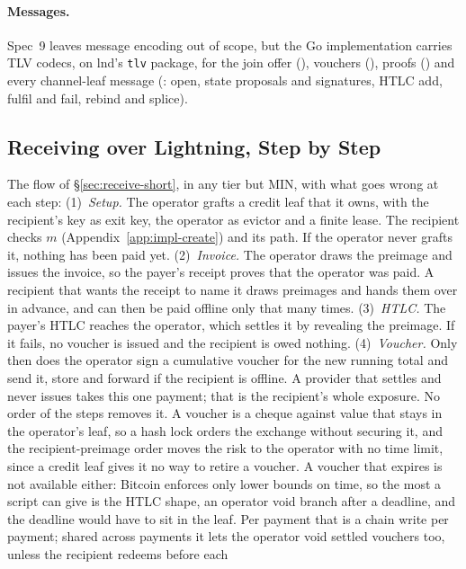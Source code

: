 \paragraph{Messages.} Spec~9 leaves message encoding out of scope, but
the Go implementation carries TLV codecs, on lnd's \texttt{tlv} package, for the
join offer (), vouchers (),
proofs () and every channel-leaf message
(: open, state proposals and signatures, HTLC add,
fulfil and fail, rebind and splice).

\subsection{Receiving over Lightning, Step by Step}\label{app:impl-receive}

The flow of \S\ref{sec:receive-short}, in any tier but MIN, with what goes
wrong at each step:
(1)~\emph{Setup.} The operator grafts a credit leaf that it owns, with
the recipient's key as exit key, the operator as evictor and a finite
lease. The recipient checks $m$ (Appendix~\ref{app:impl-create}) and its
path. If the operator never grafts it, nothing has been paid yet.
(2)~\emph{Invoice.} The operator draws the preimage and issues the
invoice, so the payer's receipt proves that the operator was paid. A
recipient that wants the receipt to name it draws preimages and hands
them over in advance, and can then be paid offline only that many times.
(3)~\emph{HTLC.} The payer's HTLC reaches the operator, which settles it
by revealing the preimage. If it fails, no voucher is issued and the
recipient is owed nothing.
(4)~\emph{Voucher.} Only then does the operator sign a cumulative voucher
for the new running total and send it, store and forward if the
recipient is offline. A provider that settles and never issues takes
this one payment; that is the recipient's whole exposure. No order
of the steps removes it. A voucher is a cheque against value that stays
in the operator's leaf, so a hash lock orders the exchange without
securing it, and the recipient-preimage order moves the risk to the
operator with no time limit, since a credit leaf gives it no way to
retire a voucher. A voucher that expires is not available either:
Bitcoin enforces only lower bounds on time, so the most a script can
give is the HTLC shape, an operator void branch after a deadline, and
the deadline would have to sit in the leaf. Per payment that is a chain
write per payment; shared across payments it lets the operator void
settled vouchers too, unless the recipient redeems before each
